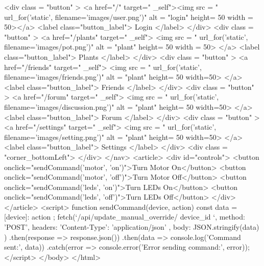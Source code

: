 \documentclass[12pt]{article} %
\begin{document}
\begin{htmlcode}[caption={Control Panel Html}]
        <div class = "button" > 
           <a href="/" target=" _self"><img src = "{{ url_for('static', filename='images/user.png')}}" alt = "login" height= 50 width = 50></a>
           <label class="button_label"> Login </label> 
        </div>
        <div class = "button" > 
           <a href="/plants" target=" _self"> <img src = "{{ url_for('static', filename='images/pot.png')}}" alt = "plant" height= 50 width = 50> </a>
           <label class="button_label"> Plants </label> 
        </div>
        <div class = "button" > 
           <a href="/friends" target=" _self"> <img src = "{{ url_for('static', filename='images/friends.png')}}" alt = "plant" height= 50 width=50> </a>
           <label class="button_label"> Friends </label> 
        </div>
        <div class = "button" > 
           <a href="/forum" target=" _self"> <img src = "{{ url_for('static', filename='images/discussion.png')}}" alt = "plant" height= 50 width=50> </a>
           <label class="button_label"> Forum </label> 
        </div>
        <div class = "button" > 
           <a href="/settings" target=" _self"> <img src = "{{ url_for('static', filename='images/setting.png')}}" alt = "plant" height= 50 width=50> </a>
           <label class="button_label"> Settings </label> 
        </div>
           <div class = "corner_bottomLeft"> </div>
       </nav>
    <article>
        <div id="controls">
            <button onclick="sendCommand('motor', 'on')">Turn Motor On</button>
            <button onclick="sendCommand('motor', 'off')">Turn Motor Off</button>
            <button onclick="sendCommand('leds', 'on')">Turn LEDs On</button>
            <button onclick="sendCommand('leds', 'off')">Turn LEDs Off</button>
        </div>
    </article>
    <script>
        function sendCommand(device, action) {
            const data = { [device]: action };
            fetch(`/api/update_manual_override/{{ device_id }}`, {
                method: 'POST',
                headers: { 'Content-Type': 'application/json' },
                body: JSON.stringify(data)
            })
            .then(response => response.json())
            .then(data => console.log('Command sent:', data))
            .catch(error => console.error('Error sending command:', error));
        }
    </script>
    </body>
    </html>
    \end{htmlcode}
    
    \pagebreak
    
\end{document}
